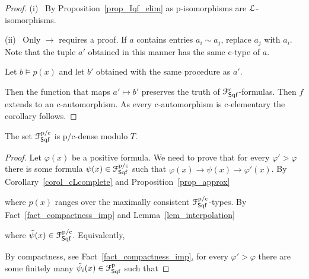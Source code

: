 \documentclass{amsproc}
\begin{document}
{\begin{proof}
  (i) \ 
  By Proposition~\ref{prop_Iqf_elim} as p-isomorphisms are ${\EuScript L}$-isomorphisms.


  (ii) \ 
  Only $\rightarrow$ requires a proof.
  If $a$ contains entries $a_i\sim a_j$, replace $a_j$ with $a_i$.
  Note that the tuple $a'$ obtained in this manner has the same c-type of $a$.
 
  Let $b\models p(x)$ and let $b'$ obtained with the same procedure as $a'$.
  
  Then the function that maps $a'\mapsto b'$ preserves the truth of ${\EuScript F}^{\rm c}_{{\sf S}{\rm qf}}$-formulas.
  Then $f$ extends to an c-automorphism.
  As every c-automorphism is c-elementary the corollary follows.
\end{proof}

\begin{proposition}\label{prop_cLHapprox1}
  The set ${\EuScript F}^{\rm p/c}_{{\sf S}{\rm qf}}$ is p/c-dense modulo $T$.
\end{proposition}

\begin{proof}
  Let $\varphi(x)$ be a positive formula.
  We need to prove that for every $\varphi'>\varphi$ there is some formula $\psi(x)\in{\EuScript F}^{\rm p/c}_{{\sf S}{\rm qf}}$ such that $\varphi(x)\rightarrow\psi(x)\rightarrow\varphi'(x)$.
  By Corollary~\ref{corol_cLcomplete} and Proposition~\ref{prop_approx}


  where $p(x)$ ranges over the maximally consistent ${\EuScript F}^{\rm p/c}_{{\sf S}{\rm qf}}$-types.
  By Fact~\ref{fact_compactness_imp} and Lemma~\ref{lem_interpolation}


  where $\tilde{\psi}(x)\in{\EuScript F}^{\rm p/c}_{{\sf S}{\rm qf}}$.
  Equivalently,


  By compactness, see Fact~\ref{fact_compactness_imp}, for every $\varphi'>\varphi$ there are some finitely many $\tilde{\psi}_i(x)\in{\EuScript F}^{\rm p}_{{\sf S}{\rm qf}}$ such that

  \ceq{\hfill\varphi'(x)}{\leftarrow}{\bigwedge_{i=1,\dots,n}\tilde{\psi}_i(x)\ \ \leftarrow\ \ \varphi(x)}


\end{proof}}
\end{document}
